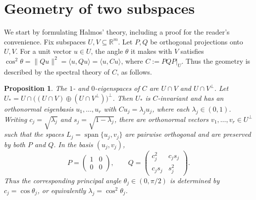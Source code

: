 \documentclass{article}
\theoremstyle{plain}
\newtheorem{prop}[theo]{Proposition}
\theoremstyle{definition}
\newcommand{\mb}[1]{\mathbb{#1}}
\newcommand{\sub}{\subseteq}
\begin{document}
\section{Geometry of two subspaces}

We start by formulating Halmos' theory, including a proof for the reader's convenience.
Fix subspaces $U,V\sub\mb R^m$. Let $P,Q$ be orthogonal projections onto $U,V$.
For a unit vector $u\in U$, the angle $\theta$ it makes with $V$ satisfies
$\cos^2 \theta = \|Qu\|^2 = \langle u,Qu\rangle = \langle u,Cu\rangle$, where $C:=PQP|_U$. 
Thus the geometry is described by the spectral theory of $C$, as follows.


\begin{prop}\label{prop:halmos}
The $1$- and $0$-eigenspaces of $C$ are $U \cap V$ and $U \cap V^\perp$.
Let \( U_*= U\cap\bigl((U\cap V)\oplus(U\cap V^\perp)\bigr)^\perp\).
Then $U_*$ is $C$-invariant and has an orthonormal eigenbasis
$u_1,\ldots,u_r$ with \(Cu_j=\lambda_j u_j\),
where each \( \lambda_j \in (0,1) \).
Writing $c_j=\sqrt{\lambda_j}$ and $s_j=\sqrt{1-\lambda_j}$, there are
orthonormal vectors $v_1,\ldots,v_r\in U^\perp$ such that the spaces
$L_j=\operatorname{span}\{u_j,v_j\}$ are pairwise orthogonal and are
preserved by both $P$ and $Q$.  In the basis $(u_j,v_j)$,
\begin{equation}\label{eq:halmos-block}
 P=
 \begin{pmatrix}
  1&0\\
  0&0
 \end{pmatrix},
 \qquad
 Q=
 \begin{pmatrix}
  c_j^2&c_js_j\\
  c_js_j&s_j^2
 \end{pmatrix}.
\end{equation}
Thus the corresponding principal angle $\theta_j\in(0,\pi/2)$ is
determined by $c_j=\cos\theta_j$, or equivalently
$\lambda_j=\cos^2\theta_j$.
\end{prop}
\end{document}
